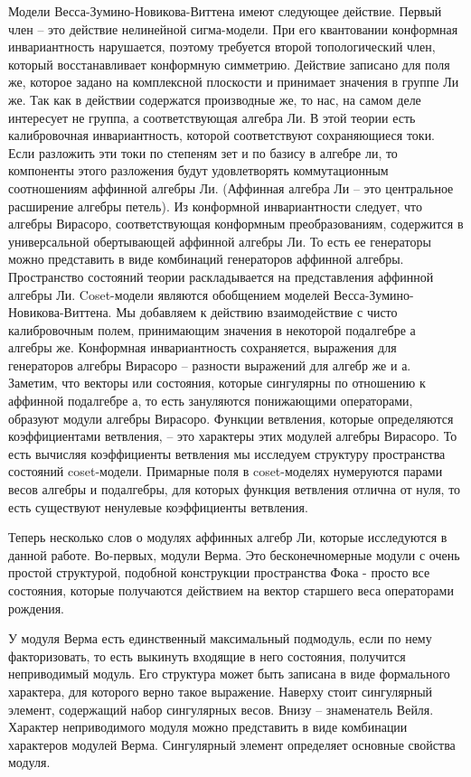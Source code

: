 \documentclass{article}
\theoremstyle{definition} \newtheorem{Def}{Определение}
\begin{document}
Модели Весса-Зумино-Новикова-Виттена имеют следующее действие. Первый член -- это действие нелинейной сигма-модели. При его квантовании конформная инвариантность нарушается, поэтому требуется второй топологический член, который восстанавливает конформную симметрию. Действие записано для поля же, которое задано на комплексной плоскости и принимает значения в группе Ли же. Так как в действии содержатся производные же, то нас, на самом деле интересует не группа, а соответствующая алгебра Ли. В этой теории есть калибровочная инвариантность, которой соответствуют сохраняющиеся токи. Если разложить эти токи по степеням зет и по базису в алгебре ли, то компоненты этого разложения будут удовлетворять коммутационным соотношениям аффинной алгебры Ли. (Аффинная алгебра Ли -- это центральное расширение алгебры петель). 
Из конформной инвариантности следует, что алгебры Вирасоро, соответствующая конформным преобразованиям, содержится в универсальной обертывающей аффинной алгебры Ли. То есть ее генераторы можно представить в виде комбинаций генераторов аффинной алгебры. Пространство состояний теории раскладывается на представления аффинной алгебры Ли. 
Coset-модели являются обобщением моделей Весса-Зумино-Новикова-Виттена. Мы добавляем к действию взаимодействие с чисто калибровочным полем, принимающим значения в некоторой подалгебре а алгебры же. 
Конформная инвариантность сохраняется, выражения для генераторов алгебры Вирасоро -- разности выражений для алгебр же и а. 
Заметим, что векторы или состояния, которые сингулярны по отношению к аффинной подалгебре а, то есть зануляются понижающими операторами, образуют модули алгебры Вирасоро. Функции ветвления, которые определяются коэффициентами ветвления, -- это характеры этих модулей алгебры Вирасоро. То есть вычисляя коэффициенты ветвления мы исследуем структуру пространства состояний coset-модели. Примарные поля в coset-моделях нумеруются парами весов алгебры и подалгебры, для которых функция ветвления отлична от нуля, то есть существуют ненулевые коэффициенты ветвления. 

Теперь несколько слов о модулях аффинных алгебр Ли, которые исследуются в данной работе. 
Во-первых, модули Верма. Это бесконечномерные модули с очень простой структурой, подобной конструкции пространства Фока - просто все состояния, которые получаются действием на вектор старшего веса операторами рождения. 

У модуля Верма есть единственный максимальный подмодуль, если по нему факторизовать, то есть выкинуть входящие в него состояния, получится неприводимый модуль. Его структура может быть записана в виде формального характера, для которого верно такое выражение. Наверху стоит сингулярный элемент, содержащий набор сингулярных весов. Внизу -- знаменатель Вейля. Характер неприводимого модуля можно представить в виде комбинации характеров модулей Верма. 
Сингулярный элемент определяет основные свойства модуля. 
\end{document}

